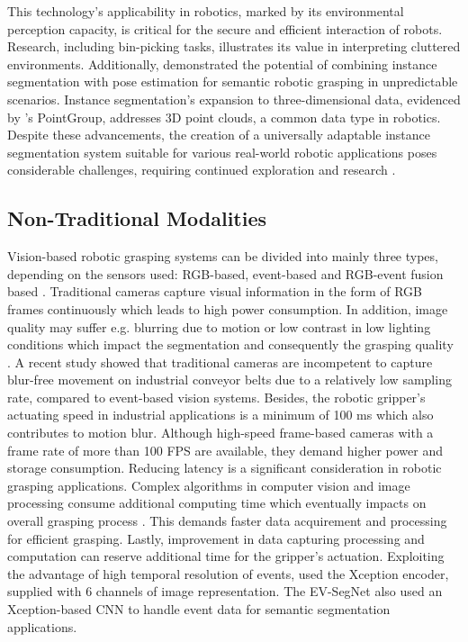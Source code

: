 \documentclass[lettersize,journal]{IEEEtran}
\begin{document}
This technology's applicability in robotics, marked by its environmental perception capacity, is critical for the secure and efficient interaction of robots. Research, including \cite{Feng2022TowardsPicking} bin-picking tasks, illustrates its value in interpreting cluttered environments. Additionally, \cite{Tremblay2018DeepObjects} demonstrated the potential of combining instance segmentation with pose estimation for semantic robotic grasping in unpredictable scenarios. Instance segmentation's expansion to three-dimensional data, evidenced by \cite{Jiang2020PointGroup:Segmentation}'s PointGroup, addresses 3D point clouds, a common data type in robotics. Despite these advancements, the creation of a universally adaptable instance segmentation system suitable for various real-world robotic applications poses considerable challenges, requiring continued exploration and research \cite{Krawczyk2023SegmentationReview, Karthik2022Contour-enhancedSegmentation}.

\subsection{\textbf{Non-Traditional Modalities}}
Vision-based robotic grasping systems can be divided into mainly three types, depending on the sensors used: RGB-based,  event-based and RGB-event fusion based \cite{Ayyad2022NeuromorphicSystems,Xu2023Event-drivenModeling}. Traditional cameras capture visual information in the form of RGB frames continuously which leads to high power consumption. In addition, image quality may suffer e.g. blurring due to motion or low contrast in low lighting conditions which impact the segmentation and consequently the grasping quality \cite{Brooks2019LearningBlur}\cite{LiyuanPan2019BringingCamera}. A recent study showed that traditional cameras are incompetent to capture blur-free movement on industrial conveyor belts due to a relatively low sampling rate, compared to event-based vision systems. Besides, the robotic gripper’s actuating speed in industrial applications is a minimum of 100 ms \cite{Muthusamy2020NeuromorphicManipulation} which also contributes to motion blur. Although high-speed frame-based cameras with a frame rate of more than 100 FPS are available, they demand higher power and storage consumption. Reducing latency is a significant consideration in robotic grasping applications. Complex algorithms in computer vision and image processing consume additional computing time which eventually impacts on overall grasping process \cite{Huang2020NeuromorphicApplications}. This demands faster data acquirement and processing for efficient grasping. Lastly, improvement in data capturing processing and computation can reserve additional time for the gripper’s actuation. Exploiting the advantage of high temporal resolution of events, \cite{Gehrig2018AsynchronousFrames} used the Xception encoder, supplied with 6 channels of image representation. The EV-SegNet \cite{Alonso2018EV-SegNet:Cameras} also used an Xception-based CNN to handle event data for semantic segmentation applications.
\end{document}
